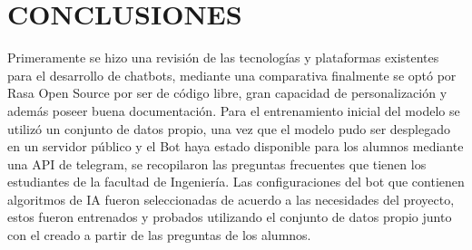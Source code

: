 \chapter[CONCLUSIONES]{CONCLUSIONES}

Primeramente se hizo una revisión de las tecnologías y plataformas existentes para el desarrollo de chatbots,
mediante una comparativa finalmente se optó por Rasa Open Source por ser de código libre, 
gran capacidad de personalización y además poseer buena documentación.
Para el entrenamiento inicial del modelo se utilizó un conjunto de datos propio, una vez que el modelo pudo ser desplegado en un servidor público
y el Bot haya estado disponible para los alumnos mediante una API de telegram, se recopilaron las preguntas frecuentes que tienen los estudiantes de la facultad de Ingeniería.
Las configuraciones del bot que contienen algoritmos de IA fueron seleccionadas de acuerdo a las necesidades del proyecto, estos fueron
entrenados y probados utilizando el conjunto de datos propio junto con el creado a partir de las preguntas de los alumnos.
